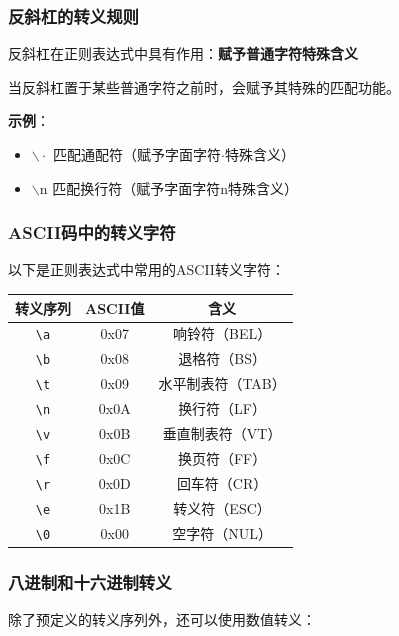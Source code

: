 \documentclass[12pt,a4paper,UTF8]{ctexart}
\begin{document}
\subsubsection{反斜杠的转义规则}

\qquad 反斜杠在正则表达式中具有作用：\textbf{赋予普通字符特殊含义}

当反斜杠置于某些普通字符之前时，会赋予其特殊的匹配功能。

\textbf{示例}：
\begin{itemize}
    \item $\backslash\cdot$ 匹配通配符（赋予字面字符$\cdot$特殊含义）
    \item $\backslash \text{n}$ 匹配换行符（赋予字面字符$\text{n}$特殊含义）
\end{itemize}

\subsubsection{ASCII码中的转义字符}

以下是正则表达式中常用的ASCII转义字符：

\begin{center}
\begin{tabular}{|c|c|c|}
\hline
\textbf{转义序列} & \textbf{ASCII值} & \textbf{含义} \\
\hline
\verb|\a| & 0x07 & 响铃符（BEL） \\
\hline
\verb|\b| & 0x08 & 退格符（BS） \\
\hline
\verb|\t| & 0x09 & 水平制表符（TAB） \\
\hline
\verb|\n| & 0x0A & 换行符（LF） \\
\hline
\verb|\v| & 0x0B & 垂直制表符（VT） \\
\hline
\verb|\f| & 0x0C & 换页符（FF） \\
\hline
\verb|\r| & 0x0D & 回车符（CR） \\
\hline
\verb|\e| & 0x1B & 转义符（ESC） \\
\hline
\verb|\0| & 0x00 & 空字符（NUL） \\
\hline
\end{tabular}
\end{center}

\subsubsection{八进制和十六进制转义}

\qquad 除了预定义的转义序列外，还可以使用数值转义：
\end{document}
